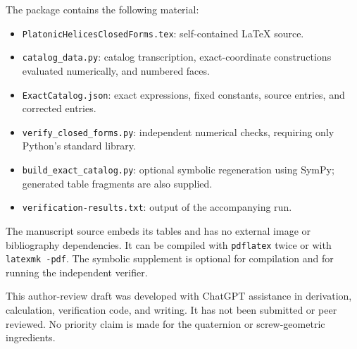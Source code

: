 \documentclass[11pt]{article}
\theoremstyle{definition}
\begin{document}
The package contains the following material:
\begin{itemize}
 \item \texttt{PlatonicHelicesClosedForms.tex}: self-contained LaTeX source.
 \item \texttt{catalog\_data.py}: catalog transcription, exact-coordinate
       constructions evaluated numerically, and numbered faces.
 \item \texttt{ExactCatalog.json}: exact expressions, fixed constants,
       source entries, and corrected entries.
 \item \texttt{verify\_closed\_forms.py}: independent numerical checks,
       requiring only Python's standard library.
 \item \texttt{build\_exact\_catalog.py}: optional symbolic regeneration
       using SymPy; generated table fragments are also supplied.
 \item \texttt{verification-results.txt}: output of the accompanying run.
\end{itemize}
The manuscript source embeds its tables and has no external image or
bibliography dependencies. It can be compiled with \texttt{pdflatex} twice
or with \texttt{latexmk -pdf}. The symbolic supplement is optional for
compilation and for running the independent verifier.

This author-review draft was developed with ChatGPT assistance in derivation,
calculation, verification code, and writing. It has not been submitted or
peer reviewed. No priority claim is made for the quaternion or screw-geometric
ingredients.
\end{document}
